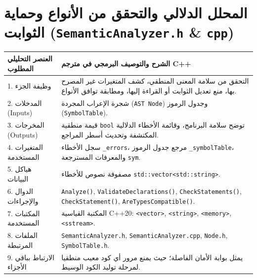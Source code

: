 \documentclass[11pt,a4paper,oneside]{report}
\begin{document}
\section{المحلل الدلالي والتحقق من الأنواع وحماية الثوابت (\texttt{SemanticAnalyzer.h} \& \texttt{cpp})}
\begin{longtable}{|p{4.2cm}|p{12.2cm}|}
\hline
\rowcolor{NavyBlue}\color{white}\textbf{\arabicfont العنصر التحليلي المطلوب} & \rowcolor{NavyBlue}\color{white}\textbf{\arabicfont الشرح والتوصيف البرمجي في مترجم C++} \\
\hline
\endhead
1. وظيفة الجزء & التحقق من سلامة المعنى المنطقي، كشف المتغيرات غير المصرح بها، منع تعديل الثوابت أو القراءة إليها، ومطابقة توافق الأنواع. \\
\hline
2. المدخلات (Inputs) & شجرة الإعراب المجردة (\texttt{AST Node}) وجدول الرموز (\texttt{SymbolTable}). \\
\hline
3. المخرجات (Outputs) & قيمة منطقية \texttt{bool} توضح سلامة البرنامج، وقائمة الأخطاء الدلالية المكتشفة وتحديث أسطر المراجع. \\
\hline
4. المتغيرات المستخدمة & سجل الأخطاء \texttt{\_errors}، مرجع جدول الرموز \texttt{\_symbolTable}، والمعرفات المسترجعة \texttt{sym}. \\
\hline
5. هياكل البيانات & مصفوفة نصوص للأخطاء \texttt{std::vector<std::string>}. \\
\hline
6. الدوال والإجراءات & \texttt{Analyze()}, \texttt{ValidateDeclarations()}, \texttt{CheckStatements()}, \texttt{CheckStatement()}, \texttt{AreTypesCompatible()}. \\
\hline
7. المكتبات المستخدمة & المكتبة القياسية C++20: \texttt{<vector>}, \texttt{<string>}, \texttt{<memory>}, \texttt{<sstream>}. \\
\hline
8. الملفات المرتبطة & \texttt{SemanticAnalyzer.h}, \texttt{SemanticAnalyzer.cpp}, \texttt{Node.h}, \texttt{SymbolTable.h}. \\
\hline
9. الارتباط بباقي الأجزاء & يمثل بوابة الأمان الفاصلة؛ حيث يمنع مرور أي كود معيب منطقيا لمرحلة توليد الكود الوسيط. \\
\hline
\end{longtable}
\end{document}
